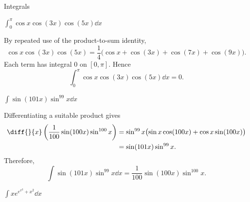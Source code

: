 \begin{expectedproblemgroup}{Integrals}
        \begin{expectedsubproblem}
            \(\displaystyle
                \int_0^\pi\cos x\cos(3x)\cos(5x)\dd x
            \)
        \end{expectedsubproblem}

        \begin{expectedsubsolution}
            By repeated use of the product-to-sum identity,
            \[
                \cos x\cos(3x)\cos(5x)
                =
                \frac{1}{4}
                \bigl(
                    \cos x+\cos(3x)+\cos(7x)+\cos(9x)
                \bigr).
            \]
            Each term has integral $0$ on $[0,\pi]$. Hence
            \[
                \boxed{
                    \int_0^\pi\cos x\cos(3x)\cos(5x)\dd x=0
                }.
            \]
        \end{expectedsubsolution}

        \begin{expectedsubproblem}
            \(\displaystyle
                \int\sin(101x)\sin^{99}x\dd x
            \)
        \end{expectedsubproblem}

        \begin{expectedsubsolution}
            Differentiating a suitable product gives
            \[
                \begin{aligned}
                    \diff{}{x}
                    \left(
                        \frac{1}{100}\sin(100x)\sin^{100}x
                    \right)
                    &=
                    \sin^{99}x
                    \bigl(
                        \sin x\cos(100x)
                        +
                        \cos x\sin(100x)
                    \bigr)\\
                    &=
                    \sin(101x)\sin^{99}x.
                \end{aligned}
            \]
            Therefore,
            \[
                \boxed{
                    \int\sin(101x)\sin^{99}x\dd x
                    =
                    \frac{1}{100}\sin(100x)\sin^{100}x
                }.
            \]
        \end{expectedsubsolution}

        \begin{expectedsubproblem}
            \(\displaystyle
                \int x e^{e^{x^2}+x^2}\dd x
            \)
        \end{expectedsubproblem}


\end{expectedproblemgroup}

